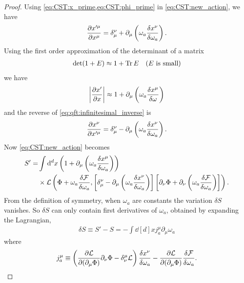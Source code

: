 \documentclass[10pt]{article}
\begin{document}
\begin{proof}
    Using \cref{eq:CST:x_prime,eq:CST:phi_prime} in \cref{eq:CST:new_action}, we have
    \begin{align}
        \pdv{x'^\mu}{x^\mu}=\delta^\nu_\mu+\partial_\mu\left(\omega_a\fdv{x^\nu}{\omega_a}\right).\label{eq:qft:infinitesimal_inverse}
    \end{align}
    Using the first order approximation of the determinant of a matrix
    \begin{align}
        \det(1+E)\approx1+\Tr E\quad(E\ \text{is small})
    \end{align}
    we have
    \begin{align}
        \abs{\pdv{x'}{x}}\approx1+\partial_\mu\left(\omega_a\fdv{x^\mu}{\omega}\right)
    \end{align}
    and the reverse of \cref{eq:qft:infinitesimal_inverse} is
    \begin{align}
        \pdv{x^\nu}{x'^\mu}=\delta^\nu_\mu-\partial_\mu\left(\omega_a\fdv{x^\nu}{\omega_a}\right).
    \end{align}
    Now \cref{eq:CST:new_action} becomes
    \begin{align}
        S'= & \int\dd[d]{x}\left(1+\partial_\mu\left(\omega_a\fdv{x^\mu}{\omega_a}\right)\right)\notag                                                                                                                                                             \\
            & \times\mathcal{L}\left(\Phi+\omega_a\fdv{\mathcal{F}}{\omega_a},\left[\delta^\nu_\mu-\partial_\mu\left(\omega_a\fdv{x^\nu}{\omega_a}\right)\right]\left[\partial_\nu\Phi+\partial_\nu\left(\omega_a\fdv{\mathcal{F}}{\omega_a}\right)\right]\right).
    \end{align}
    From the definition of symmetry, when $\omega_a$ are constants the variation $\delta S$ vanishes.
    So $\delta S$ can only contain first derivatives of $\omega_a$, obtained by expanding the Lagrangian\snm,
    \begin{align}
        \delta S\equiv S'-S=-\int\dd[d]{x}j^\mu_a\partial_\mu\omega_a\label{eq:nother:before_integration}
    \end{align}
    where
    \begin{align}
        j^\mu_a\equiv\left(\pdv{\mathcal{L}}{(\partial_\mu\Phi)}\partial_\nu\Phi-\delta^\mu_\nu\mathcal{L}\right)\fdv{x^\nu}{\omega_a}-\pdv{\mathcal{L}}{(\partial_\mu\Phi)}\fdv{\mathcal{F}}{\omega_a}.\label{eq:nother:canonical_current}
    \end{align}

\end{proof}
\end{document}
